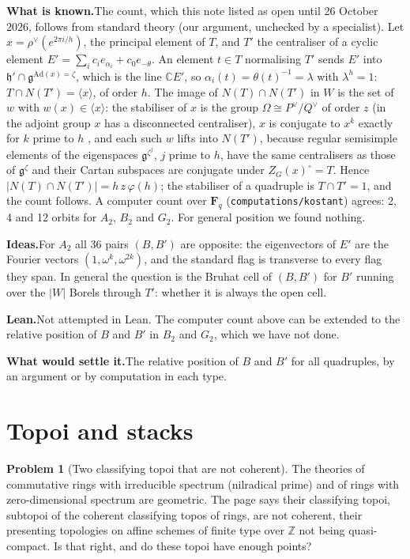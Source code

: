 \documentclass[11pt]{article}
\theoremstyle{definition}
\newtheorem{problem}{Problem}
\theoremstyle{plain}\newtheorem*{proposition}{Proposition}\theoremstyle{definition}
\newcommand{\entry}[1]{\par\medskip\noindent\textbf{#1}\enspace}
\newcommand{\known}{\entry{What is known.}}
\newcommand{\ideas}{\entry{Ideas.}}
\newcommand{\leanst}{\entry{Lean.}}
\newcommand{\settle}{\entry{What would settle it.}}
\begin{document}
\known The count, which this note listed as open until 26 October 2026, follows from standard theory (our argument, unchecked by a specialist). Let $x = \rho^\vee(e^{2\pi i/h})$, the principal element of $T$, and $T'$ the centraliser of a cyclic element $E' = \sum_i c_i e_{\alpha_i} + c_0 e_{-\theta}$. An element $t \in T$ normalising $T'$ sends $E'$ into $\mathfrak h' \cap \mathfrak g^{\mathrm{Ad}(x) = \zeta}$, which is the line $\mathbb C E'$, so $\alpha_i(t) = \theta(t)^{-1} = \lambda$ with $\lambda^h = 1$: $T \cap N(T') = \langle x \rangle$, of order $h$. The image of $N(T) \cap N(T')$ in $W$ is the set of $w$ with $w(x) \in \langle x \rangle$: the stabiliser of $x$ is the group $\Omega \cong P^\vee / Q^\vee$ of order $z$ (in the adjoint group $x$ has a disconnected centraliser), $x$ is conjugate to $x^k$ exactly for $k$ prime to $h$ \cite{kostant,springer}, and each such $w$ lifts into $N(T')$, because regular semisimple elements of the eigenspaces $\mathfrak g^{\zeta^j}$, $j$ prime to $h$, have the same centralisers as those of $\mathfrak g^{\zeta}$ and their Cartan subspaces are conjugate under $Z_G(x)^\circ = T$. Hence $|N(T) \cap N(T')| = h\,z\,\varphi(h)$; the stabiliser of a quadruple is $T \cap T' = 1$, and the count follows. A computer count over $\mathbf F_q$ (\nolinkurl{computations/kostant}) agrees: 2, 4 and 12 orbits for $A_2$, $B_2$ and $G_2$. For general position we found nothing.

\ideas For $A_2$ all $36$ pairs $(B, B')$ are opposite: the eigenvectors of $E'$ are the Fourier vectors $(1, \omega^k, \omega^{2k})$, and the standard flag is transverse to every flag they span. In general the question is the Bruhat cell of $(B, B')$ for $B'$ running over the $|W|$ Borels through $T'$: whether it is always the open cell.

\leanst Not attempted in Lean. The computer count above can be extended to the relative position of $B$ and $B'$ in $B_2$ and $G_2$, which we have not done.

\settle The relative position of $B$ and $B'$ for all quadruples, by an argument or by computation in each type.

\section{Topoi and stacks}

\begin{problem}[Two classifying topoi that are not coherent]\label{p:noncoh}
The theories of commutative rings with irreducible spectrum (nilradical prime) and of rings with zero-dimensional spectrum are geometric. The page says their classifying topoi, subtopoi of the coherent classifying topos of rings, are not coherent, their presenting topologies on affine schemes of finite type over $\mathbb Z$ not being quasi-compact. Is that right, and do these topoi have enough points?
\end{problem}
\end{document}
